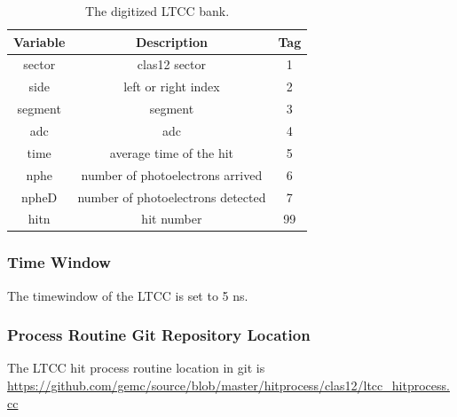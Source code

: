 \begin{table}[h]
	\begin{center}
		\begin{tabular}{| c | c | c |}
			\hline \hline
			Variable    & Description                                        & Tag  \\
			\hline
             sector  &                                     clas12 sector  &    1 \\
               side  &                               left or right index  &    2 \\
            segment  &                                           segment  &    3 \\
                adc  &                                               adc  &    4 \\
               time  &                           average time of the hit  &    5 \\
               nphe  &                  number of photoelectrons arrived  &    6 \\
              npheD  &                 number of photoelectrons detected  &    7 \\
               hitn  &                                        hit number  &   99 \\
			\hline \hline
		\end{tabular}
	\end{center}
	\caption{The digitized LTCC bank.}\label{tab:ltccBank}
\end{table}

\subsubsection{Time Window}
The timewindow of the LTCC is set to 5 ns.

\subsubsection{Process Routine Git Repository Location}
The LTCC hit process routine location in git is \url{https://github.com/gemc/source/blob/master/hitprocess/clas12/ltcc_hitprocess.cc}
